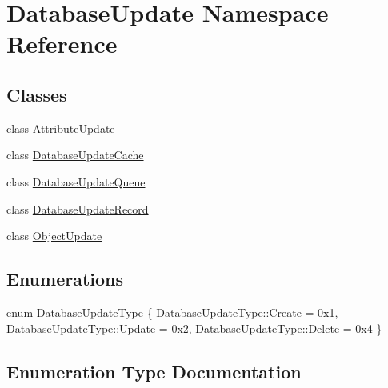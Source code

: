 \hypertarget{namespace_database_update}{}\section{Database\+Update Namespace Reference}
\label{namespace_database_update}
\subsection*{Classes}
\begin{DoxyCompactItemize}
\item 
class \hyperlink{class_database_update_1_1_attribute_update}{Attribute\+Update}
\item 
class \hyperlink{class_database_update_1_1_database_update_cache}{Database\+Update\+Cache}
\item 
class \hyperlink{class_database_update_1_1_database_update_queue}{Database\+Update\+Queue}
\item 
class \hyperlink{class_database_update_1_1_database_update_record}{Database\+Update\+Record}
\item 
class \hyperlink{class_database_update_1_1_object_update}{Object\+Update}
\end{DoxyCompactItemize}
\subsection*{Enumerations}
\begin{DoxyCompactItemize}
\item 
enum \hyperlink{namespace_database_update_ae6c52e997ff1fee40dea9a47376e54a1}{Database\+Update\+Type} \{ \hyperlink{namespace_database_update_ae6c52e997ff1fee40dea9a47376e54a1a686e697538050e4664636337cc3b834f}{Database\+Update\+Type\+::\+Create} = 0x1, 
\hyperlink{namespace_database_update_ae6c52e997ff1fee40dea9a47376e54a1a06933067aafd48425d67bcb01bba5cb6}{Database\+Update\+Type\+::\+Update} = 0x2, 
\hyperlink{namespace_database_update_ae6c52e997ff1fee40dea9a47376e54a1af2a6c498fb90ee345d997f888fce3b18}{Database\+Update\+Type\+::\+Delete} = 0x4
 \}
\end{DoxyCompactItemize}


\subsection{Enumeration Type Documentation}
\hypertarget{namespace_database_update_ae6c52e997ff1fee40dea9a47376e54a1}{}
